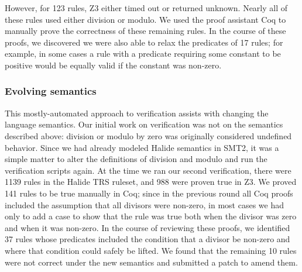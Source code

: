 \documentclass[acmsmall,review]{acmart}\settopmatter{printfolios=true,printccs=false,printacmref=false}
\newcommand{\NumPredicatesRelaxed}{{\color{black} 17}\xspace}
\newcommand{\NumZdivRules}{{\color{black} 1139}\xspace}
\newcommand{\NumZdivZThreeProvedRules}{{\color{black} 988}\xspace}
\newcommand{\NumZdivCoqProvedRules}{{\color{black} 141}\xspace}
\newcommand{\NumZdivFalseRules}{{\color{black} 10}\xspace}
\newcommand{\NumZdivRelaxedPredicates}{{\color{black} 37}\xspace}
\begin{document}
However, for 123
rules, Z3 either timed out or returned unknown. Nearly all of these rules used
either division or modulo. We used the proof assistant Coq to manually prove the
correctness of these remaining rules. In the course of these proofs, we
discovered we were also able to relax the predicates of \NumPredicatesRelaxed
rules; for example, in some cases a rule
with a predicate requiring some constant to be positive would be equally valid
if the constant was non-zero.

%

\subsubsection{Evolving semantics}
\label{sub:evolvingsemantics}

This mostly-automated approach to verification assists with changing
the language semantics. Our initial work on verification was not on
the semantics described above: division or modulo by zero was originally
considered undefined behavior. Since we had already
modeled Halide semantics in SMT2, it was a simple matter to alter the
definitions of division and modulo and run the verification scripts
again. At the time we ran our second verification, there were
\NumZdivRules rules in the Halide TRS ruleset, and \NumZdivZThreeProvedRules
were proven true in Z3. We proved \NumZdivCoqProvedRules rules to be
true manually in Coq; since in the previous round all Coq proofs
included the assumption that all divisors were non-zero, in most cases
we had only to add a case to show that the rule was true both when the
divisor was zero and when it was non-zero. In the course of reviewing
these proofs, we identified \NumZdivRelaxedPredicates rules whose
predicates included the condition that a divisor be non-zero and where
that condition could safely be lifted. We found that the remaining
\NumZdivFalseRules rules were not correct under the new semantics and
submitted a patch to amend them.
\end{document}
